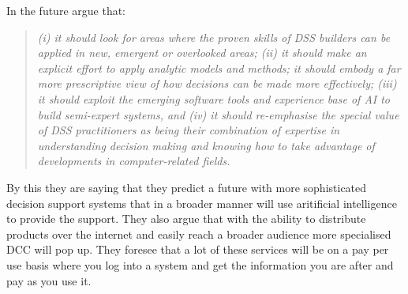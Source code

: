 In the future \cite{shim2002past} argue that:
\begin{quotation}
\textit{(i) it should look for areas where the proven skills of DSS builders can be applied in new, emergent or overlooked areas; (ii) it should make an explicit effort to apply analytic models and methods; it should embody a far more prescriptive view of how decisions can be made more effectively; (iii) it should exploit the emerging software tools and
experience base of AI to build semi-expert systems, and (iv) it should re-emphasise the special value of DSS practitioners as being their combination of expertise in understanding decision making and knowing how to take advantage of developments in computer-related fields.}
\end{quotation}
By this they are saying that they predict a future with more sophisticated decision support systems that in a broader manner will use aritificial intelligence to provide the support. They also argue that with the ability to distribute products over the internet and easily reach a broader audience more specialised DCC will pop up. They foresee that a lot of these services will be on a pay per use basis where you log into a system and get the information you are after and pay as you use it.

